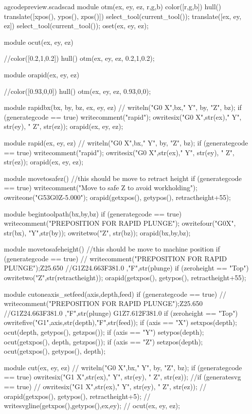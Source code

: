 \documentclass{ltxdoc}
\begin{document}
\lstset{firstnumber=\thegcpscad}
\begin{writecode}{a}{gcodepreview.scad}{scad}
module otm(ex, ey, ez, r,g,b) {
color([r,g,b]) hull(){
    translate([xpos(), ypos(), zpos()]){
      select_tool(current_tool());
    }
    translate([ex, ey, ez]){
      select_tool(current_tool());
    }
  }
oset(ex, ey, ez);
}

module ocut(ex, ey, ez) {
//color([0.2,1,0.2]) hull(){
otm(ex, ey, ez, 0.2,1,0.2);
}

module orapid(ex, ey, ez) {
//color([0.93,0,0]) hull(){
otm(ex, ey, ez, 0.93,0,0);
}

module rapidbx(bx, by, bz, ex, ey, ez) {
//	writeln("G0 X",bx," Y", by, "Z", bz);
if (generategcode == true) {
	writecomment("rapid");
	owritesix("G0 X",str(ex)," Y", str(ey), " Z", str(ez));
}
    orapid(ex, ey, ez);
}

module rapid(ex, ey, ez) {
//	writeln("G0 X",bx," Y", by, "Z", bz);
if (generategcode == true) {
	writecomment("rapid");
	owritesix("G0 X",str(ex)," Y", str(ey), " Z", str(ez));
}
    orapid(ex, ey, ez);
}

module movetosafez() {
//this should be move to retract height
if (generategcode == true) {
	writecomment("Move to safe Z to avoid workholding");
    owriteone("G53G0Z-5.000");
}
    orapid(getxpos(), getypos(), retractheight+55);
}

module begintoolpath(bx,by,bz) {
if (generategcode == true) {
	writecomment("PREPOSITION FOR RAPID PLUNGE");
    owritefour("G0X", str(bx), "Y",str(by));
    owritetwo("Z", str(bz));
    }
    orapid(bx,by,bz);
}

module movetosafeheight() {
//this should be move to machine position
if (generategcode == true) {
//	writecomment("PREPOSITION FOR RAPID PLUNGE");Z25.650
//G1Z24.663F381.0 ,"F",str(plunge)
if (zeroheight == "Top") {
    owritetwo("Z",str(retractheight));
}
}
    orapid(getxpos(), getypos(), retractheight+55);
}

module cutoneaxis_setfeed(axis,depth,feed) {
if (generategcode == true) {
//	writecomment("PREPOSITION FOR RAPID PLUNGE");Z25.650
//G1Z24.663F381.0 ,"F",str(plunge) G1Z7.612F381.0
if (zeroheight == "Top") {
    owritefive("G1",axis,str(depth),"F",str(feed));
}
}
if (axis == "X") {setxpos(depth);
ocut(depth, getypos(), getzpos());}
if (axis == "Y") {setypos(depth);
ocut(getxpos(), depth, getzpos());}
if (axis == "Z") {setzpos(depth);
ocut(getxpos(), getypos(), depth);}
}

module cut(ex, ey, ez) {
//	writeln("G0 X",bx," Y", by, "Z", bz);
if (generategcode == true) {
	owritesix("G1 X",str(ex)," Y", str(ey), " Z", str(ez));
}
//if (generatesvg == true) {
//	owritesix("G1 X",str(ex)," Y", str(ey), " Z", str(ez));
//    orapid(getxpos(), getypos(), retractheight+5);
//    writesvgline(getxpos(),getypos(),ex,ey);
//}
ocut(ex, ey, ez);
}

}}
\end{writecode}
\end{document}
